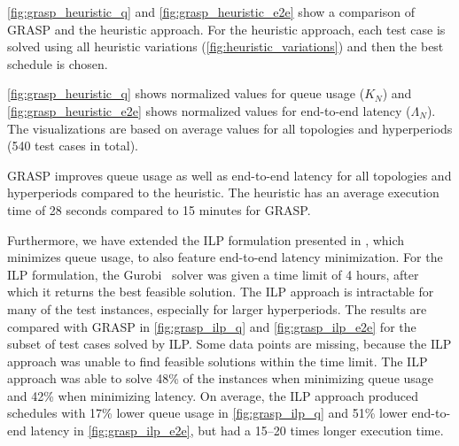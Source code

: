 \autoref{fig:grasp_heuristic_q} and \autoref{fig:grasp_heuristic_e2e} show a comparison of GRASP and the heuristic approach.
For the heuristic approach, each test case is solved using all heuristic variations (\autoref{fig:heuristic_variations}) and then the best schedule is chosen.
\begin{modifiedparagraph}
\autoref{fig:grasp_heuristic_q} shows normalized values for queue usage ($K_N$) and \autoref{fig:grasp_heuristic_e2e} shows normalized values for end-to-end latency ($\Lambda_N$). The visualizations are based on average values for all topologies and hyperperiods (540 test cases in total).
\end{modifiedparagraph}
GRASP improves queue usage as well as end-to-end latency for all topologies and hyperperiods compared to the heuristic.
The heuristic has an average execution time of 28 seconds compared to 15 minutes for GRASP.

\begin{modifiedparagraph}
Furthermore, we have extended the ILP formulation presented in \cite{pop16}, which minimizes queue usage, to also feature end-to-end latency minimization.
For the ILP formulation, the Gurobi~\cite{gurobi} solver was given a time limit of 4 hours, after which it returns the best feasible solution.
The ILP approach is intractable for many of the test instances, especially for larger hyperperiods.
The results are compared with GRASP in \autoref{fig:grasp_ilp_q} and \autoref{fig:grasp_ilp_e2e} for the subset of test cases solved by ILP.
Some data points are missing, because the ILP approach was unable to find feasible solutions within the time limit. The ILP approach was able to solve 48\% of the instances when minimizing queue usage and 42\% when minimizing latency.
On average, the ILP approach produced schedules with 17\% lower queue usage in \autoref{fig:grasp_ilp_q} and 51\% lower end-to-end latency in \autoref{fig:grasp_ilp_e2e}, but had a 15--20 times longer execution time.
\end{modifiedparagraph}

